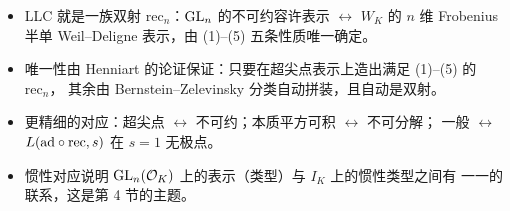 \begin{keytakeaways}
\begin{itemize}[leftmargin=1.5em]
\item LLC 就是一族双射 $\mathrm{rec}_n$：$\mathrm{GL}_n$ 的不可约容许表示 $\leftrightarrow$
      $W_K$ 的 $n$ 维 Frobenius 半单 Weil--Deligne 表示，由 (1)--(5) 五条性质唯一确定。
\item 唯一性由 Henniart 的论证保证：只要在超尖点表示上造出满足 (1)--(5) 的 $\mathrm{rec}_n$，
      其余由 Bernstein--Zelevinsky 分类自动拼装，且自动是双射。
\item 更精细的对应：超尖点 $\leftrightarrow$ 不可约；本质平方可积 $\leftrightarrow$ 不可分解；
      一般 $\leftrightarrow$ $L(\mathrm{ad}\circ\mathrm{rec},s)$ 在 $s=1$ 无极点。
\item 惯性对应说明 $\mathrm{GL}_n(\mathcal{O}_K)$ 上的表示（类型）与 $I_K$ 上的惯性类型之间有
      一一的联系，这是第 4 节的主题。
\end{itemize}
\end{keytakeaways}
